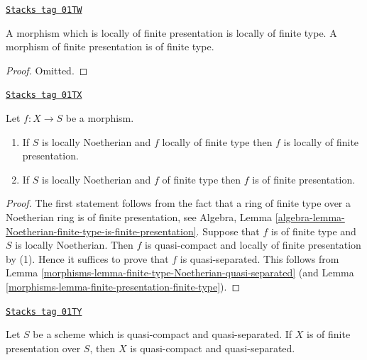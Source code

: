 \begin{lemma}
\label{morphisms-lemma-finite-presentation-finite-type}
\href{https://stacks.math.columbia.edu/tag/01TW}{\texttt{Stacks tag 01TW}}

A morphism which is locally of finite presentation is locally of finite type.
A morphism of finite presentation is of finite type.
\end{lemma}

\begin{proof}
Omitted.
\end{proof}

\begin{lemma}
\label{morphisms-lemma-noetherian-finite-type-finite-presentation}
\href{https://stacks.math.columbia.edu/tag/01TX}{\texttt{Stacks tag 01TX}}


Let $f : X \to S$ be a morphism.
\begin{enumerate}
\item If $S$ is locally Noetherian and $f$ locally of finite type
then $f$ is locally of finite presentation.
\item If $S$ is locally Noetherian and $f$ of finite type
then $f$ is of finite presentation.
\end{enumerate}
\end{lemma}

\begin{proof}

The first statement follows from the fact that a ring
of finite type over a Noetherian ring is of finite presentation, see Algebra,
Lemma \ref{algebra-lemma-Noetherian-finite-type-is-finite-presentation}.
Suppose that $f$ is of finite type and $S$ is locally Noetherian.
Then $f$ is quasi-compact and locally of finite presentation by (1).
Hence it suffices to prove that $f$ is quasi-separated.
This follows from Lemma \ref{morphisms-lemma-finite-type-Noetherian-quasi-separated}
(and Lemma \ref{morphisms-lemma-finite-presentation-finite-type}).
\end{proof}

\begin{lemma}
\label{morphisms-lemma-finite-presentation-quasi-compact-quasi-separated}
\href{https://stacks.math.columbia.edu/tag/01TY}{\texttt{Stacks tag 01TY}}

Let $S$ be a scheme which is quasi-compact and quasi-separated.
If $X$ is of finite presentation over $S$, then $X$ is quasi-compact
and quasi-separated.
\end{lemma}

